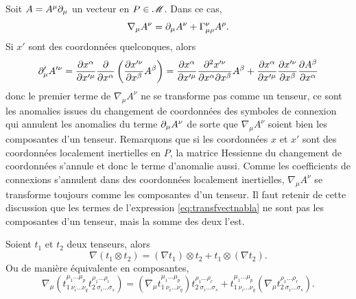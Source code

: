 \documentclass[a4paper,11pt]{report}
\begin{document}
                \begin{exmp}
                    Soit $A = A^\mu\partial_\mu$ un vecteur en $P\in\mathscr{M}$. Dans ce cas, 
                    \begin{equation}
                        \nabla_\mu A^\nu = \partial_\mu A^\nu+\Gamma^\nu_{\mu\rho}A^\rho.
                    \end{equation}
                    Si $x'$ sont des coordonnées quelconques, alors
                    \begin{equation}
                        \partial'_\mu A'^\nu  = \pdv{x^\alpha}{x'^\mu}\pdv{}{x^\alpha}\left( \pdv{x'^\nu}{x^\beta}A^\beta \right) = \pdv{x^\alpha}{x'^\mu}\pdv{x'^\nu}{x^\alpha}{x^\beta}A^\beta+\pdv{x^\alpha}{x'^\mu}\pdv{x'^\nu}{x^\beta}\pdv{A^\beta}{x^\alpha}\label{eq:transfvectnabla}
                    \end{equation}
                    donc le premier terme de $\nabla_\mu A^\nu$ ne se transforme pas comme un tenseur, ce sont les anomalies issues du changement de coordonnées des symboles de connexion qui annulent les anomalies du terme $\partial_\mu A^\nu$ de sorte que $\nabla_\mu A^\nu$ soient bien les composantes d'un tenseur. Remarquons que si les coordonnées $x$ et $x'$ sont des coordonnées localement inertielles en $P$, la matrice Hessienne du changement de coordonnées s'annule et donc le terme d'anomalie aussi. Comme les coefficients de connexions s'annulent dans des coordonnées localement inertielles, $\nabla_\mu A^\nu$ se transforme toujours comme les composantes d'un tenseur. Il faut retenir de cette discussion que les termes de l'expression \ref{eq:transfvectnabla} ne sont pas les composantes d'un tenseur, mais la somme des deux l'est.
                \end{exmp}
                
                \begin{prop}\begin{leftbar}
                    Soient $t_1$ et $t_2$ deux tenseurs, alors
                    \begin{equation}
                        \nabla(t_1\otimes t_2) = (\nabla t_1)\otimes t_2 + t_1\otimes(\nabla t_2).
                    \end{equation}
                    Ou de manière équivalente en composantes,
                    \begin{equation}
                         \nabla_\mu (t^{\mu_1\dots\mu_p}_{1~\nu_i\dots\nu_q}t^{\rho_1\dots\rho_r}_{2~\sigma_i\dots\sigma_s}) = (\nabla_\mu t^{\mu_1\dots\mu_p}_{1~\nu_i\dots\nu_q})t^{\rho_1\dots\rho_r}_{2~\sigma_i\dots\sigma_s} + t^{\mu_1\dots\mu_p}_{1~\nu_i\dots\nu_q} (\nabla_\mu t^{\rho_1\dots\rho_r}_{2~\sigma_i\dots\sigma_s}).
                    \end{equation}
                \end{leftbar}\end{prop}
                
\end{document}
